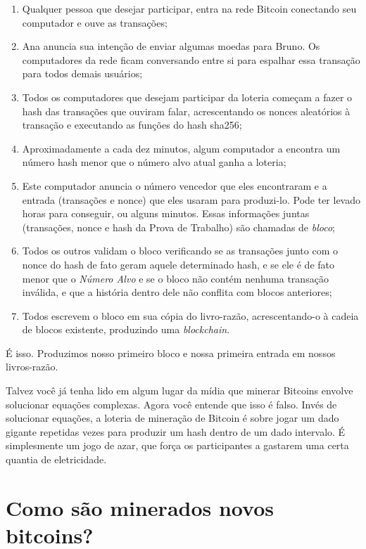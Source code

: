 \begin{enumerate}
\item Qualquer pessoa que desejar participar, entra na rede Bitcoin conectando seu computador e ouve as transações;
\item Ana anuncia sua intenção de enviar algumas moedas para Bruno. Os computadores da rede ficam conversando entre si para espalhar essa transação para todos demais usuários;
\item Todos os computadores que desejam participar da loteria começam a fazer o hash das transações que ouviram falar, acrescentando os nonces aleatórios à transação e executando as funções do hash sha256;
\item Aproximadamente a cada dez minutos, algum computador a encontra um número hash menor que o número alvo atual ganha a loteria;
\item Este computador anuncia o número vencedor que eles encontraram e a entrada (transações e nonce) que eles usaram para produzi-lo. Pode ter levado horas para conseguir, ou alguns minutos. Essas informações juntas (transações, nonce e hash da Prova de Trabalho) são chamadas de \textit{bloco};
\item Todos os outros validam o bloco verificando se as transações junto com o nonce do hash de fato geram aquele determinado hash, e se ele é de fato menor que o \textit{Número Alvo} e se o bloco não contém nenhuma transação inválida, e que a história dentro dele não conflita com blocos anteriores;
\item Todos escrevem o bloco em sua cópia do livro-razão, acrescentando-o à cadeia de blocos existente, produzindo uma \textit{blockchain}.
\end{enumerate}

É isso. Produzimos nosso primeiro bloco e nossa primeira entrada em nossos livros-razão.

Talvez você já tenha lido em algum lugar da mídia que minerar Bitcoins envolve solucionar equações complexas. Agora você entende que isso é falso. Invés de solucionar equações, a loteria de mineração de Bitcoin é sobre jogar um dado gigante repetidas vezes para produzir um hash dentro de um dado intervalo. É simplesmente um jogo de azar, que força os participantes a gastarem uma certa quantia de eletricidade. 

\section*{Como são minerados novos bitcoins?}

